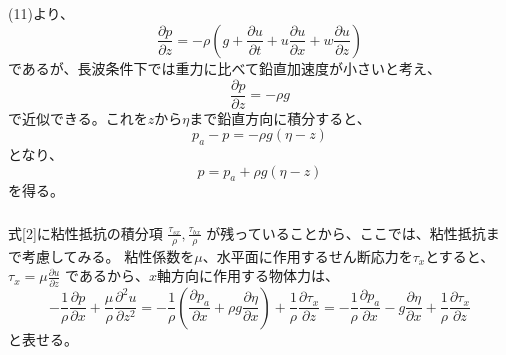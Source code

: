 \documentclass[a4paper]{jsarticle}
\begin{document}
\subsection{}
\subsubsection{}
(11)より、
\begin{equation}
  \frac{\partial p}{\partial z}
  = -\rho \left(g + \frac{\partial u}{\partial t} + u \frac{\partial u}{\partial x} + w \frac{\partial u}{\partial z}\right)
\end{equation}
であるが、長波条件下では重力に比べて鉛直加速度が小さいと考え、
\begin{equation}
  \frac{\partial p}{\partial z} = -\rho g
\end{equation}
で近似できる。これを$z$から$\eta$まで鉛直方向に積分すると、
\begin{equation}
  p_a - p = -\rho g (\eta - z)
\end{equation}
となり、
\begin{equation}
  p = p_a + \rho g (\eta - z)
\end{equation}
を得る。
\subsubsection{}
式[2]に粘性抵抗の積分項
$\frac{\tau_{sx}}{\rho}, \frac{\tau_{bx}}{\rho}$
が残っていることから、ここでは、粘性抵抗まで考慮してみる。
粘性係数を$\mu$、水平面に作用するせん断応力を$\tau_x$とすると、
$\tau_x = \mu \frac{\partial u}{\partial z}$
であるから、$x$軸方向に作用する物体力は、
\begin{equation}
  -\frac{1}{\rho} \frac{\partial p}{\partial x}
  + \frac{\mu}{\rho} \frac{\partial^2 u}{\partial z^2}
  = -\frac{1}{\rho} \left(\frac{\partial p_a}{\partial x}
  + \rho g \frac{\partial \eta}{\partial x}\right)
  + \frac{1}{\rho} \frac{\partial \tau_x}{\partial z}
  = -\frac{1}{\rho} \frac{\partial p_a}{\partial x}
  - g \frac{\partial \eta}{\partial x}
  + \frac{1}{\rho} \frac{\partial \tau_x}{\partial z}
\end{equation}
と表せる。

\subsection{}
\end{document}

